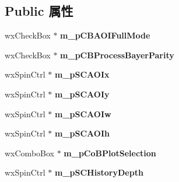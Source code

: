 \subsection*{Public 属性}
\begin{DoxyCompactItemize}
\item 
\hypertarget{struct_image_analysis_plot_controls_a2fa8671af287681d2c64c22a4579647c}{wx\+Check\+Box $\ast$ {\bfseries m\+\_\+p\+C\+B\+A\+O\+I\+Full\+Mode}}\label{struct_image_analysis_plot_controls_a2fa8671af287681d2c64c22a4579647c}

\item 
\hypertarget{struct_image_analysis_plot_controls_a1b0e84dcc2751d5bfd575d7ecbf40c47}{wx\+Check\+Box $\ast$ {\bfseries m\+\_\+p\+C\+B\+Process\+Bayer\+Parity}}\label{struct_image_analysis_plot_controls_a1b0e84dcc2751d5bfd575d7ecbf40c47}

\item 
\hypertarget{struct_image_analysis_plot_controls_ac79f2415d956049667a41cb71cb96bda}{wx\+Spin\+Ctrl $\ast$ {\bfseries m\+\_\+p\+S\+C\+A\+O\+Ix}}\label{struct_image_analysis_plot_controls_ac79f2415d956049667a41cb71cb96bda}

\item 
\hypertarget{struct_image_analysis_plot_controls_aaa2bc28cabc867d0496032732afb8fac}{wx\+Spin\+Ctrl $\ast$ {\bfseries m\+\_\+p\+S\+C\+A\+O\+Iy}}\label{struct_image_analysis_plot_controls_aaa2bc28cabc867d0496032732afb8fac}

\item 
\hypertarget{struct_image_analysis_plot_controls_ab60d51d81610f298fa2e83c2ad0e084c}{wx\+Spin\+Ctrl $\ast$ {\bfseries m\+\_\+p\+S\+C\+A\+O\+Iw}}\label{struct_image_analysis_plot_controls_ab60d51d81610f298fa2e83c2ad0e084c}

\item 
\hypertarget{struct_image_analysis_plot_controls_a19458bbc6726878ae374756816a89a54}{wx\+Spin\+Ctrl $\ast$ {\bfseries m\+\_\+p\+S\+C\+A\+O\+Ih}}\label{struct_image_analysis_plot_controls_a19458bbc6726878ae374756816a89a54}

\item 
\hypertarget{struct_image_analysis_plot_controls_a62df3c67df2237dce8c2ec29d6e4fd19}{wx\+Combo\+Box $\ast$ {\bfseries m\+\_\+p\+Co\+B\+Plot\+Selection}}\label{struct_image_analysis_plot_controls_a62df3c67df2237dce8c2ec29d6e4fd19}

\item 
\hypertarget{struct_image_analysis_plot_controls_a12cede3482fce800ef7be643634603e4}{wx\+Spin\+Ctrl $\ast$ {\bfseries m\+\_\+p\+S\+C\+History\+Depth}}\label{struct_image_analysis_plot_controls_a12cede3482fce800ef7be643634603e4}


\end{DoxyCompactItemize}

